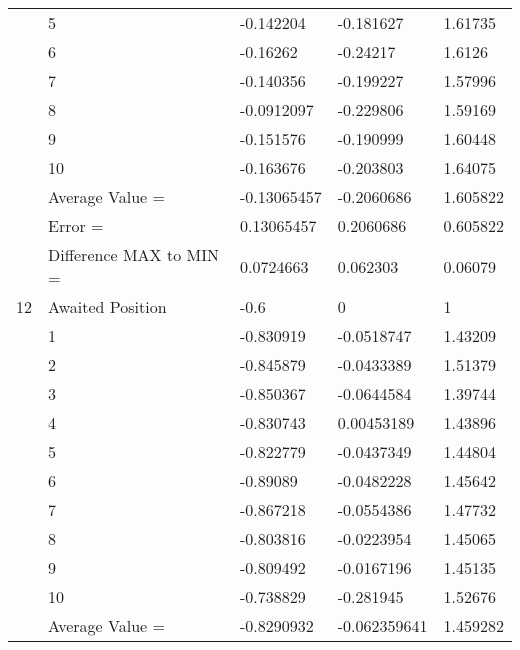 \begin{tabular}{|p{2cm}|p{3cm}|p{3cm}|p{3cm}|p{3cm}|}
             & 5                       & -0.142204    & -0.181627    & 1.61735    \\
             & 6                       & -0.16262     & -0.24217     & 1.6126     \\
             & 7                       & -0.140356    & -0.199227    & 1.57996    \\
             & 8                       & -0.0912097   & -0.229806    & 1.59169    \\
             & 9                       & -0.151576    & -0.190999    & 1.60448    \\
             & 10                      & -0.163676    & -0.203803    & 1.64075    \\
             & Average Value =         & -0.13065457  & -0.2060686   & 1.605822   \\
             & Error =                 & 0.13065457   & 0.2060686    & 0.605822   \\
             & Difference MAX to MIN = & 0.0724663    & 0.062303     & 0.06079    \\
\hline
12           & Awaited Position        & -0.6         & 0            & 1          \\
             & 1                       & -0.830919    & -0.0518747   & 1.43209    \\
             & 2                       & -0.845879    & -0.0433389   & 1.51379    \\
             & 3                       & -0.850367    & -0.0644584   & 1.39744    \\
             & 4                       & -0.830743    & 0.00453189   & 1.43896    \\
             & 5                       & -0.822779    & -0.0437349   & 1.44804    \\
             & 6                       & -0.89089     & -0.0482228   & 1.45642    \\
             & 7                       & -0.867218    & -0.0554386   & 1.47732    \\
             & 8                       & -0.803816    & -0.0223954   & 1.45065    \\
             & 9                       & -0.809492    & -0.0167196   & 1.45135    \\
             & 10                      & -0.738829    & -0.281945    & 1.52676    \\
             & Average Value =         & -0.8290932   & -0.062359641 & 1.459282   \\

\end{tabular}
